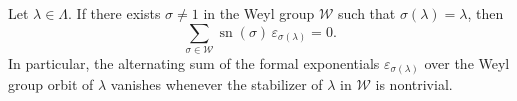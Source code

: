 Let $\lambda \in \Lambda$. If there exists $\sigma \neq 1$ in the Weyl group $\mathcal{W}$ such that $\sigma(\lambda) = \lambda$, then
$$
\sum_{\sigma \in \mathcal{W}} \operatorname{sn}(\sigma) \, \varepsilon_{\sigma(\lambda)} = 0.
$$
In particular, the alternating sum of the formal exponentials $\varepsilon_{\sigma(\lambda)}$ over the Weyl group orbit of $\lambda$ vanishes whenever the stabilizer of $\lambda$ in $\mathcal{W}$ is nontrivial.
